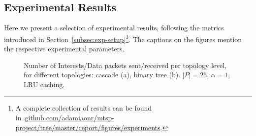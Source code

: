 \subsection{Experimental Results}
\label{subsec:exp-results}

Here we present a selection of experimental results, following the metrics 
introduced in Section~\ref{subsec:exp-setup}\footnote{A complete collection of 
results can be found in~\url{github.com/adamiaonr/mtsp-project/tree/master/report/figures/experiments}.}. 
The captions on the figures mention the respective experimental parameters.\shortvertbreak


\begin{figure}[h!]
    \centering


    \cprotect\caption{Number of Interests\slash Data packets sent\slash received 
        per topology level, for different topologies: cascade (a), binary tree (b). 
        $|P| = 25$, $\alpha = 1$, LRU caching.}
    \label{fig:exp-results-topologies}

\end{figure}


